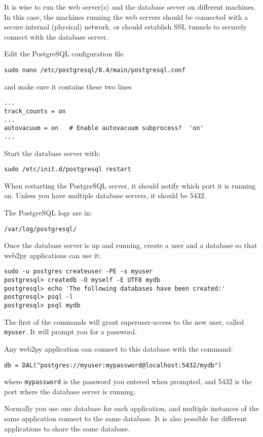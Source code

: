 \documentclass[justified,sixbynine,notoc]{tufte-book}
\def\ft{\small\tt}
\begin{document}
\begin{fullwidth}
It is wise to run the web server(s) and the database server on different machines. In this case, the machines running the web servers should be connected with a secure internal (physical) network, or should establish SSL tunnels to securely connect with the database server.

Edit the PostgreSQL configuration file
\begin{lstlisting}
sudo nano /etc/postgresql/8.4/main/postgresql.conf
\end{lstlisting}
\noindent and make sure it contains these two lines
\begin{lstlisting}
...
track_counts = on
...
autovacuum = on   # Enable autovacuum subprocess?  'on'
...
\end{lstlisting}

Start the database server with:
\begin{lstlisting}
sudo /etc/init.d/postgresql restart
\end{lstlisting}

When restarting the PostgreSQL server, it should notify which port it is running on. Unless you have multiple database servers, it should be 5432.

The PostgreSQL logs are in:
\begin{lstlisting}
/var/log/postgresql/
\end{lstlisting}

Once the database server is up and running, create a user and a database so that web2py applications can use it:
\begin{lstlisting}
sudo -u postgres createuser -PE -s myuser
postgresql> createdb -O myself -E UTF8 mydb
postgresql> echo 'The following databases have been created:'
postgresql> psql -l
postgresql> psql mydb
\end{lstlisting}

The first of the commands will grant superuser-access to the new user, called {\ft myuser}. It will prompt you for a password.

Any web2py application can connect to this database with the command:
\begin{lstlisting}
db = DAL("postgres://myuser:mypassword@localhost:5432/mydb")
\end{lstlisting}
\noindent where {\ft mypassword} is the password you entered when prompted, and 5432 is the port where the database server is running.

Normally you use one database for each application, and multiple instances of the same application connect to the same database. It is also possible for different applications to share the same database.


\end{fullwidth}
\end{document}
